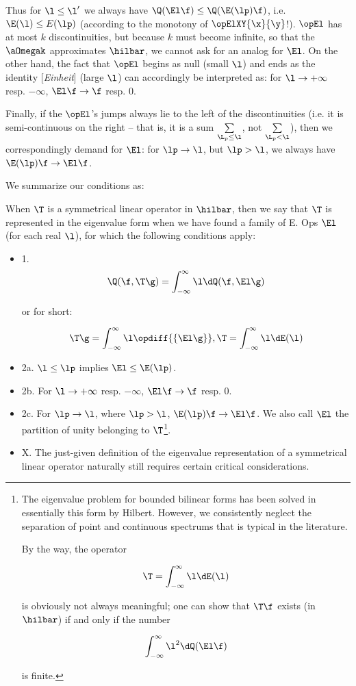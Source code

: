 \documentclass{article}
\newcommand{\WTF}[1]{
[\it{\small{#1}}]
}
\newcommand{\uequ}[1]{
\begin{align*}
#1
\end{align*}
}
\newcommand{\primed}[1]{{#1^{\prime}}}
\renewcommand{\it}[1]{\textit{#1}}
\newcommand{\sumX}[1]{\underset{#1}{\sum}}
\newcommand{\intXY}[2]{\int_{#1}^{#2}}
\begin{document}
Thus for $\l \leq \primed{\l}$ we always have $\Q(\El\f) \leq \Q(\E(\lp)\f)$, i.e. $\E(\l) \leq E(\lp)$ (according to the monotony of $\opElXY{\x}{\y}$!). $\opEl$ has at most $k$ discontinuities, but because $k$ must become infinite, so that the $\aOmegak$ approximates $\hilbar$, we cannot ask for an analog for $\El$. On the other hand, the fact that $\opEl$ begins as null (small $\l$) and ends as the identity\WTF{Einheit} (large $\l$) can accordingly be interpreted as: for $\l \to +\infty$ resp. $-\infty$, $\El\f \to \f$ resp. $0$.

Finally, if the $\opEl$'s jumps always lie to the left of the discontinuities (i.e. it is semi-continuous on the right -- that is, it is a sum $\sumX{\L_p \leq \l}$, not $\sumX{\L_p < \l}$), then we correspondingly demand for $\El$: for $\lp \to \l$, but $\lp > \l$, we always have $\E(\lp)\f \to \El\f$.

We summarize our conditions as:

When $\T$ is a symmetrical linear operator in $\hilbar$, then we say that $\T$ is represented in the eigenvalue form when we have found a family of E. Ops $\El$ (for each real $\l$), for which the following conditions apply:

\begin{itemize}
    \item{1.} \uequ{
      \Q(\f, \T\g) = \intXY{-\infty}{\infty}\l\dQ(\f, \El\g)
    }
    or for short:
    \uequ{
      \T\g = \intXY{-\infty}{\infty}\l\opdiff{\left\{\El\g\right\}},
      \T = \intXY{-\infty}{\infty}\l\dE(\l)
    }  
    \item{2a.} $\l \leq \lp$ implies $\El \leq \E(\lp)$.
    \item{2b.} For $\l \to +\infty$ resp. $-\infty$, $\El\f \to \f$ resp. $0$.
    \item{2c.} For $\lp \to \l$, where $\lp > \l$, $\E(\lp)\f \to \El\f$.
    We also call $\El$ the partition of unity belonging to $\T$\footnote{The eigenvalue problem for bounded bilinear forms has been solved in essentially this form by Hilbert. However, we consistently neglect the separation of point and continuous spectrums that is typical in the literature.
    
    By the way, the operator
    \uequ{
    \T = \intXY{-\infty}{\infty}\l\dE(\l)
    }
    is obviously not always meaningful; one can show that $\T\f$ exists (in $\hilbar$) if and only if the number
    \uequ{
    \intXY{-\infty}{\infty}\l^2\dQ(\El\f)
    }
    is finite.
     }.
    \item{X.} The just-given definition of the eigenvalue representation of a symmetrical linear operator naturally still requires certain critical considerations.
\end{itemize}
\end{document}
